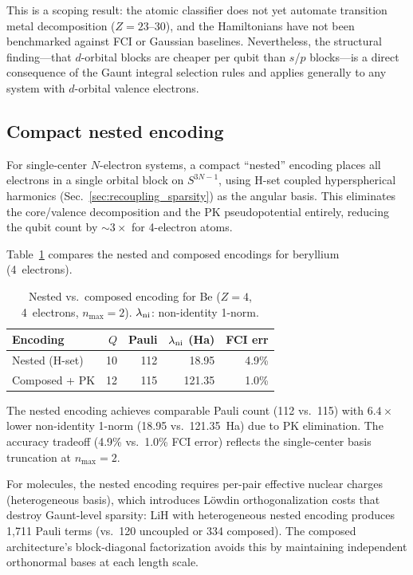 \documentclass[aps,pra,twocolumn,superscriptaddress,longbibliography]{revtex4-2}
\begin{document}
This is a scoping result: the atomic classifier does not yet automate
transition metal decomposition ($Z = 23$--30), and the Hamiltonians
have not been benchmarked against FCI or Gaussian baselines.
Nevertheless, the structural finding---that $d$-orbital blocks are
cheaper per qubit than $s$/$p$ blocks---is a direct consequence of the
Gaunt integral selection rules and applies generally to any system with
$d$-orbital valence electrons.


\subsection{Compact nested encoding}
\label{sec:nested_encoding}

For single-center $N$-electron systems, a compact ``nested'' encoding
places all electrons in a single orbital block on $S^{3N-1}$, using
H-set coupled hyperspherical harmonics (Sec.~\ref{sec:recoupling_sparsity})
as the angular basis.  This eliminates the core/valence decomposition and
the PK pseudopotential entirely, reducing the qubit count by
${\sim}3{\times}$ for 4-electron atoms.

Table~\ref{tab:nested_be} compares the nested and composed encodings for
beryllium (4~electrons).

\begin{table}[t]
\caption{Nested vs.\ composed encoding for Be ($Z = 4$, 4~electrons,
  $n_{\max} = 2$).  $\lambda_{\rm ni}$: non-identity 1-norm.}
\label{tab:nested_be}
\begin{ruledtabular}
\begin{tabular}{lrrrr}
Encoding & $Q$ & Pauli & $\lambda_{\rm ni}$ (Ha) & FCI err \\
\hline
Nested (H-set) & 10 & 112 & 18.95 & 4.9\% \\
Composed + PK  & 12 & 115 & 121.35 & 1.0\% \\
\end{tabular}
\end{ruledtabular}
\end{table}

The nested encoding achieves comparable Pauli count (112 vs.~115) with
$6.4{\times}$ lower non-identity 1-norm (18.95 vs.~121.35~Ha) due to PK
elimination.  The accuracy tradeoff (4.9\% vs.~1.0\% FCI error) reflects
the single-center basis truncation at $n_{\max} = 2$.

For molecules, the nested encoding requires per-pair effective nuclear
charges (heterogeneous basis), which introduces L\"owdin
orthogonalization costs that destroy Gaunt-level sparsity: LiH with
heterogeneous nested encoding produces 1{,}711 Pauli terms (vs.\ 120
uncoupled or 334 composed).  The composed architecture's block-diagonal
factorization avoids this by maintaining independent orthonormal bases at
each length scale.
\end{document}
